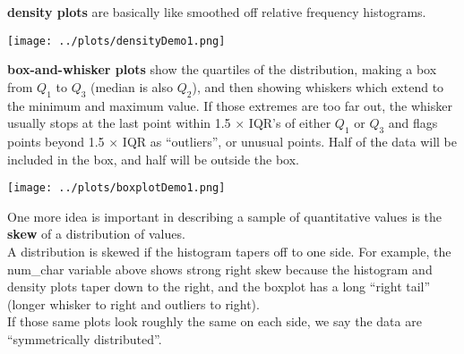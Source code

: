 \begin{list}{}{}
\begin{list}{}{}
  \item [\bf density plots] are basically like smoothed off
        relative frequency histograms. \vspace{-.4cm}

  \begin{center}
  \texttt{[image: ../plots/densityDemo1.png]}
  \end{center}

   \item [\bf box-and-whisker plots] show the quartiles of the
     distribution, making a box from $Q_1$ to $Q_3$ (median is also $Q_2$), and
     then showing whiskers which extend to the minimum and maximum
     value. If those extremes are too far out, the whisker usually
     stops at the last point within 1.5 $\times$ IQR's of either
     $Q_1$ or $Q_3$ and flags points beyond 1.5 $\times$ IQR as
     ``outliers'', or unusual points.  
     Half of the data will be included in the box, and half will be
     outside the box. \vspace{-1cm}
  \begin{center}
  \texttt{[image: ../plots/boxplotDemo1.png]} \vspace{-.5cm}
  \end{center}

\end{list}
\end{list}



One more idea is important in describing a sample of quantitative
values is the {\bf skew} of a distribution of values.  \\
  A distribution is skewed if the histogram tapers off to one
  side. For example, the num\_char variable above shows strong right
  skew because the histogram and density plots taper down to the
  right, and the boxplot has a long ``right tail'' (longer whisker to
  right and outliers to right).
\\
 If those same plots look roughly the same on each side, we say the
 data  are ``symmetrically distributed''.


